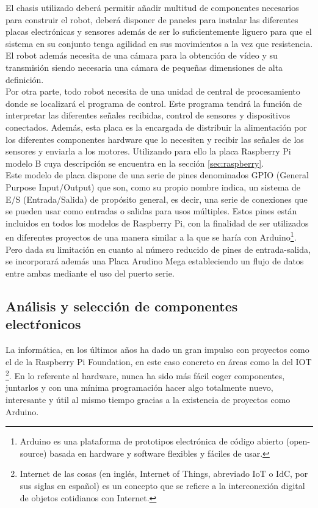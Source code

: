 El chasis utilizado deberá permitir añadir multitud de componentes necesarios para construir el robot, deberá disponer de paneles para instalar las diferentes
placas electrónicas y sensores además de ser lo suficientemente liguero para que el sistema en su conjunto tenga agilidad en sus movimientos a la vez que resistencia.\\

El robot además necesita de una cámara para la obtención de vídeo y su transmisión siendo necesaria una cámara de pequeñas dimensiones de alta definición.\\

Por otra parte, todo robot necesita de una unidad de central de procesamiento donde se localizará el programa de control. Este programa tendrá la función de interpretar las diferentes señales recibidas,
control de sensores y dispositivos conectados. Además, esta placa es la encargada de distribuir la alimentación por los diferentes componentes hardware que lo necesiten y recibir las señales de
los sensores y enviarla a los motores. Utilizando para ello la placa Raspberry Pi modelo B cuya descripción se encuentra en la sección \ref{sec:raspberry}.\\

Este modelo de placa dispone de  una serie de pines denominados GPIO (General Purpose Input/Output) que son, como su propio nombre indica, un sistema de E/S (Entrada/Salida) de propósito general,
es decir, una serie de conexiones que se pueden usar como entradas o salidas para usos múltiples. Estos pines están incluidos en todos los modelos de Raspberry Pi, con la
finalidad de ser utilizados en diferentes proyectos de una manera similar a la que se haría con Arduino\footnote{Arduino es una plataforma de prototipos electrónica de código abierto (open-source) 
basada en hardware y software flexibles y fáciles de usar.}. Pero dada su limitación en cuanto al número reducido de pines de entrada-salida, se incorporará además una Placa Arudino Mega estableciendo 
un flujo de datos entre ambas mediante el uso del puerto serie.\\


\subsection{Análisis y selección de componentes electŕonicos}

La informática, en los últimos años ha dado un gran impulso con proyectos como el de la Raspberry Pi Foundation, en este caso concreto en áreas como la del IOT \footnote{
Internet de las cosas (en inglés, Internet of Things, abreviado IoT o​ IdC, por sus siglas en español​) es un concepto que se refiere a la interconexión digital de objetos cotidianos
con Internet.​}. En lo referente al hardware, nunca ha sido más fácil coger componentes, juntarlos y con una mínima programación hacer algo totalmente nuevo, interesante y útil al
mismo tiempo gracias a la existencia de proyectos como Arduino.\\

